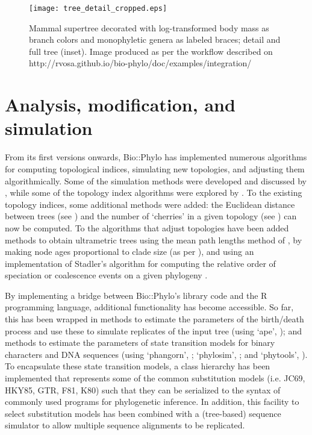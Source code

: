 \documentclass{bioinfo}
\begin{document}
\begin{figure}
\centerline{\texttt{[image: tree\_detail\_cropped.eps]}}
\caption{Mammal supertree \citep{Bininda2007} decorated with log-transformed body 
mass \citep{Jones2009} as branch colors and monophyletic genera as labeled braces; detail 
and full tree (inset). Image produced as per the workflow described on 
http://rvosa.github.io/bio-phylo/doc/examples/integration/}
\label{figure1}
\end{figure}

\section{Analysis, modification, and simulation}

From its first versions onwards, Bio::Phylo has implemented numerous algorithms for 
computing topological indices, simulating new topologies, and adjusting them 
algorithmically. Some of the simulation methods were developed and discussed by 
\citet{Hartmann2010}, while some of the topology index algorithms were explored by
\citet{Martyn2012}. To the existing topology indices, some additional methods were added: 
the Euclidean distance between trees (see \citet{Kuhner1994}) and the number of `cherries'
in a given topology (see \citet{McKenzie2000}) can now be computed. To the algorithms
that adjust topologies have been added methods to obtain ultrametric trees using the mean 
path lengths method of \citet{Britton2002}, by making node ages proportional to clade size 
(as per \citet{Grafen1989}), and using an implementation of Stadler's algorithm for 
computing the relative order of speciation or coalescence events on a given phylogeny 
\citep{Gernhard2006}.

By implementing a bridge between Bio::Phylo's library code and the R programming language,
additional functionality has become accessible. So far, this has been wrapped in methods
to estimate the parameters of the birth/death process and use these to simulate replicates
of the input tree (using `ape', \citet{Paradis2004}); and methods to estimate the 
parameters of state transition models for binary characters and DNA sequences (using
`phangorn', \cite{Schliep2010}; `phylosim', \citet{Sipos2011}; and `phytools', 
\citet{Revell2012}). To encapsulate these state transition models, a class hierarchy has
been implemented that represents some of the common substitution models (i.e. JC69,
HKY85, GTR, F81, K80) such that they can be serialized to the syntax of commonly used 
programs for phylogenetic inference. In addition, this facility to select substitution 
models has been combined with a (tree-based) sequence simulator to allow multiple sequence 
alignments to be replicated.
\end{document}
